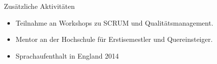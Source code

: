 \documentclass{resume} %
\begin{document}

\begin{rSection}{Zusätzliche Aktivitäten}
    \begin{itemize}
        \item 	Teilnahme an Workshops zu SCRUM und Qualitätsmanagement.
        \item	Mentor an der Hochschule für Erstisemestler und Quereinsteiger.
        \item   Sprachaufenthalt in England 2014
    \end{itemize}


\end{rSection}


\newpage %

\end{document}

